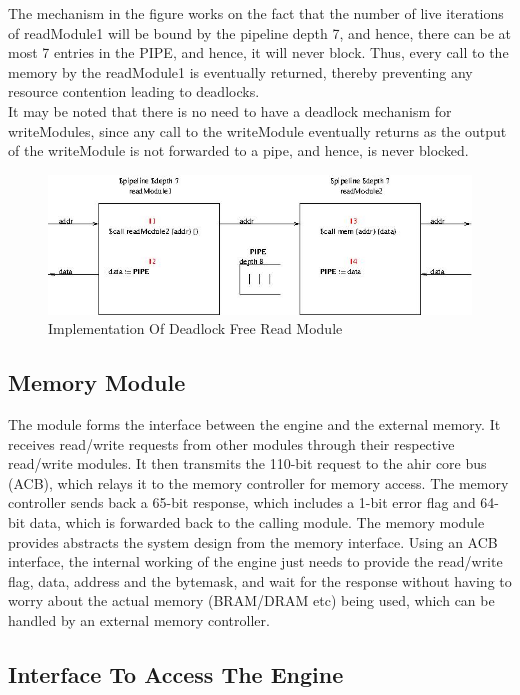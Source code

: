 \documentclass[a4paper,12pt, final]{report}
\begin{document}
The mechanism in the figure works on the fact that the number of live iterations of readModule1 will be bound by the pipeline depth 7, and hence, there can be at most 7 entries in the PIPE, and hence, it will never block. Thus, every call to the memory by the readModule1 is eventually returned, thereby preventing any resource contention leading to deadlocks.
\\

It may be noted that there is no need to have a deadlock mechanism for writeModules, since any call to the writeModule eventually returns as the output of the writeModule is not forwarded to a pipe, and hence, is never blocked.

\begin{figure}[h!]
    \centering
    \includegraphics[width=\textwidth]{Deadlock.jpg}
    \caption{Implementation Of Deadlock Free Read Module}
    \label{fig:deadlock}
\end{figure}

\subsection{Memory Module}

The module forms the interface between the engine and the external memory. It receives read/write requests from other modules through their respective read/write modules. It then transmits the 110-bit request to the ahir core bus (ACB), which relays it to the memory controller for memory access. The memory controller sends back a 65-bit response, which includes a 1-bit error flag and 64-bit data, which is forwarded back to the calling module. The memory module provides abstracts the system design from the memory interface. Using an ACB interface, the internal working of the engine just needs to provide the read/write flag, data, address and the bytemask, and wait for the response without having to worry about the actual memory (BRAM/DRAM etc) being used, which can be handled by an external memory controller.

\subsection{Interface To Access The Engine}
\end{document}
